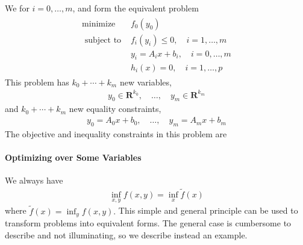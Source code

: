 \documentclass{article}
\begin{document}
We  for $i=0, \ldots, m$, and form the equivalent problem
\begin{align*}
\begin{array}{ll}
\operatorname{minimize} & f_{0}\left(y_{0}\right) \\
\text { subject to } & f_{i}\left(y_{i}\right) \leq 0, \quad i=1, \ldots, m \\
& y_{i}=A_{i} x+b_{i}, \quad i=0, \ldots, m \\
& h_{i}(x)=0, \quad i=1, \ldots, p
\end{array}
\end{align*}
This problem has $k_{0}+\cdots+k_{m}$ new variables,
\begin{align*}
y_{0} \in \mathbf{R}^{k_{0}}, \quad \ldots, \quad y_{m} \in \mathbf{R}^{k_{m}}
\end{align*}
and $k_{0}+\cdots+k_{m}$ new equality constraints,
\begin{align*}
y_{0}=A_{0} x+b_{0}, \quad \ldots, \quad y_{m}=A_{m} x+b_{m}
\end{align*}
The objective and inequality constraints in this problem are 
\paragraph{Optimizing over Some Variables}
We always have
\begin{align*}
\inf _{x, y} f(x, y)=\inf _{x} \tilde{f}(x)
\end{align*}
where $\tilde{f}(x)=\inf _{y} f(x, y) .$  This simple and general principle can be used to transform problems into equivalent forms. The general case is cumbersome to describe and not illuminating, so we describe instead an example.
\end{document}
